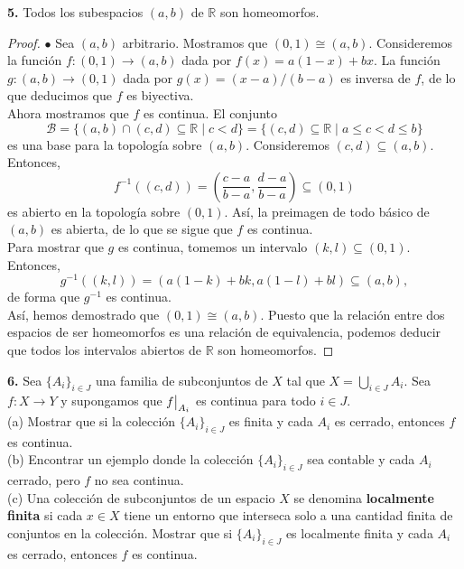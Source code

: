 \documentclass{article}
\newcommand\restr[2]{{%
		\left.\kern-\nulldelimiterspace %
		#1 %
		\vphantom{\big|} %
		\right|_{#2} %
}}
\begin{document}
\newpage

\begin{mybox}
	\textbf{5. } Todos los subespacios $(a, b)$  de $\mathbb{R}$ son homeomorfos.
\end{mybox}	
\begin{proof}
	$\bullet$ Sea $(a, b)$ arbitrario. Mostramos que $(0,1) \cong (a, b)$. Consideremos la función $f: (0, 1) \rightarrow (a, b)$ dada por $f(x) = a(1-x) + bx$. La función $g: (a, b) \rightarrow (0, 1)$ dada por $g(x) = (x- a)/ (b - a)$ es inversa de $f$, de lo que deducimos que $f$ es biyectiva. \\
	 Ahora mostramos que $f$ es continua. El conjunto 
	$$ \mathcal{B} = \{ (a, b) \cap (c, d) \subseteq \mathbb{R} \mid c < d \} = \{ (c, d) \subseteq \mathbb{R} \mid a \leq c < d \leq b \}$$
	es una base para la topología sobre $(a, b)$.  Consideremos $(c, d) \subseteq (a, b)$. Entonces, 
	$$ f^{-1}((c, d)) = \left( \frac{c - a}{b - a}, \frac{d -a}{b - a} \right) \subseteq (0, 1) $$
	es abierto en la topología sobre $(0, 1)$. Así, la preimagen de todo básico de $(a, b)$ es abierta, de lo que se sigue que $f$ es continua. \\
	Para mostrar que $g$ es continua, tomemos un intervalo $(k, l) \subseteq (0,1)$. Entonces,
	$$ g^{-1}((k, l )) = ( a(1- k) + bk, a(1- l) + bl ) \subseteq (a, b), $$
	de forma que $g^{-1}$ es continua. \\
	Así, hemos demostrado que $(0, 1) \cong (a, b)$. Puesto que la relación entre dos espacios de ser homeomorfos es una relación de equivalencia, podemos deducir que todos los intervalos abiertos de $\mathbb{R}$ son homeomorfos. 
\end{proof}

\begin{mybox}
	\textbf{6. } Sea $\{ A_{i} \}_{i \in J}$ una familia de subconjuntos de $X$ tal que $X = \bigcup_{i \in J} A_{i}$. Sea $f: X \rightarrow Y$ y supongamos que $\restr{f}{A_{i}}$ es continua para todo $i \in J$. \\
	
	(a) Mostrar que si la colección $\{ A_{i} \}_{i \in J}$ es finita y cada $A_{i}$ es cerrado, entonces $f$ es continua. \\
	
	(b) Encontrar un ejemplo donde la colección $\{ A_{i} \}_{i \in J}$ sea contable y cada $A_{i}$ cerrado, pero $f$ no sea continua.  \\
	
	(c) Una colección de subconjuntos de un espacio $X$ se denomina \textbf{localmente finita} si cada $x \in X$ tiene un entorno que interseca solo a una cantidad finita de conjuntos en la colección. Mostrar que si $\{ A_{i} \}_{i \in J}$ es localmente finita y cada $A_{i}$ es cerrado, entonces $f$ es continua.
	
\end{mybox}	
\end{document}
